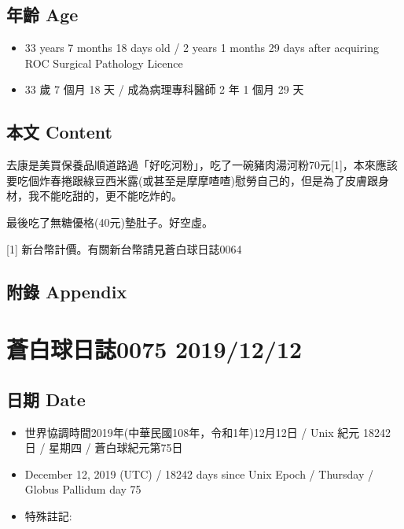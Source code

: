 \documentclass[a5paper, 12pt
]{book}
\providecommand{\tightlist}{%
  \setlength{\itemsep}{0pt}\setlength{\parskip}{0pt}}
\begin{document}
\hypertarget{ux5e74ux9f61-age-10}{%
\subsection{年齡 Age}\label{ux5e74ux9f61-age-10}}

\begin{itemize}
\tightlist
\item
  33 years 7 months 18 days old / 2 years 1 months 29 days after
  acquiring ROC Surgical Pathology Licence
\item
  33 歲 7 個月 18 天 / 成為病理專科醫師 2 年 1 個月 29 天
\end{itemize}

\hypertarget{ux672cux6587-content-10}{%
\subsection{本文 Content}\label{ux672cux6587-content-10}}

去康是美買保養品順道路過「好吃河粉」，吃了一碗豬肉湯河粉70元{[}1{]}，本來應該要吃個炸春捲跟綠豆西米露(或甚至是摩摩喳喳)慰勞自己的，但是為了皮膚跟身材，我不能吃甜的，更不能吃炸的。

最後吃了無糖優格(40元)墊肚子。好空虛。

{[}1{]} 新台幣計價。有關新台幣請見蒼白球日誌0064

\hypertarget{ux9644ux9304-appendix-10}{%
\subsection{附錄 Appendix}\label{ux9644ux9304-appendix-10}}

\hypertarget{ux84bcux767dux7403ux65e5ux8a8c0075-20191212}{%
\section{蒼白球日誌0075
2019/12/12}\label{ux84bcux767dux7403ux65e5ux8a8c0075-20191212}}

\hypertarget{ux65e5ux671f-date-11}{%
\subsection{日期 Date}\label{ux65e5ux671f-date-11}}

\begin{itemize}
\tightlist
\item
  世界協調時間2019年(中華民國108年，令和1年)12月12日 / Unix 紀元 18242
  日 / 星期四 / 蒼白球紀元第75日
\item
  December 12, 2019 (UTC) / 18242 days since Unix Epoch / Thursday /
  Globus Pallidum day 75
\item
  特殊註記:
\end{itemize}
\end{document}
